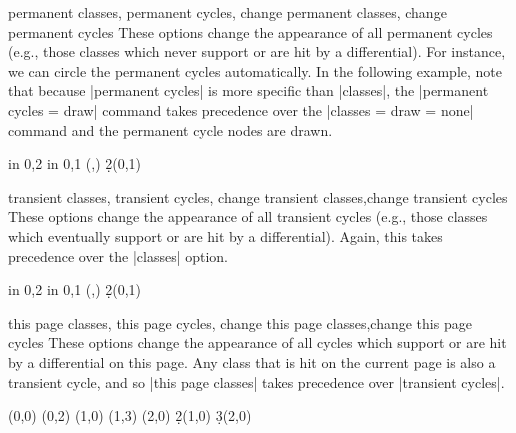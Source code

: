 \begin{sseqdata}[name = basic, cohomological Serre grading]
\begin{stylekeylist}{%
    permanent classes, permanent cycles,%
    change permanent classes, change permanent cycles%
}%
These options change the appearance of all permanent cycles (e.g., those classes
which never support or are hit by a differential). For instance, we can circle
the permanent cycles automatically. In the following example, note that because
|permanent cycles| is more specific than |classes|, the%
|permanent cycles = {draw}| command takes precedence over the%
|classes = {draw = none}| command and the permanent cycle nodes are drawn.
\begin{codeexample}[width = 6.5cm]
\begin{sseqpage}[ cohomological Serre grading,
                  classes = { draw = none },
                  permanent cycles = {draw} ]
\foreach \x in {0,2} \foreach \y in {0,1} {
    \class["\mathbb{Z}"](\x,\y)
}
\d2(0,1)
\end{sseqpage}
\end{codeexample}
\end{stylekeylist}

\begin{stylekeylist}{
    transient classes, transient cycles,
    change transient classes,change transient cycles
}%
These options change the appearance of all transient cycles (e.g., those classes
which eventually support or are hit by a differential). Again, this takes
precedence over the |classes| option.
\begin{codeexample}[width = 6.5cm]
\begin{sseqpage}[ cohomological Serre grading,
                  classes = { draw = none },
                  transient cycles = red ]
\foreach \x in {0,2} \foreach \y in {0,1} {
    \class["\mathbb{Z}"](\x,\y)
}
\d2(0,1)
\end{sseqpage}
\end{codeexample}
\end{stylekeylist}

\begin{stylekeylist}{%
    this page classes, this page cycles,%
    change this page classes,change this page cycles%
}%
These options change the appearance of all cycles which support or are hit by a
differential on this page. Any class that is hit on the current page is also a
transient cycle, and so |this page classes| takes precedence over%
|transient cycles|.
\begin{codeexample}[width = 6cm]
\begin{sseqdata}[ name = this page cycles example, Adams grading,
                  transient cycles = { red, fill }, this page cycles = { blue } ]
\class(0,0)
\class(0,2) \class(1,0)
\class(1,3) \class(2,0)
\d2(1,0) \d3(2,0)
\end{sseqdata}
\printpage[ name = this page cycles example, page = 2 ] \qquad
\printpage[ name = this page cycles example, page = 3 ]
\end{codeexample}
\end{stylekeylist}


\end{sseqdata}
